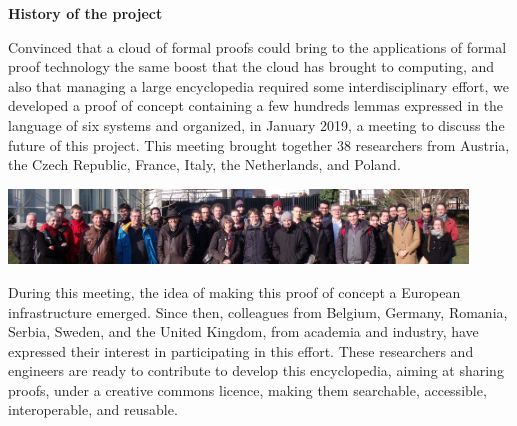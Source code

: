 \begin{shaded}
  \vspace*{-0.5cm}
  \begin{center}
    {\bf \Large History of the project}
  \end{center}

Convinced that a cloud of formal proofs could bring to the
applications of formal proof technology the same boost that the cloud
has brought to computing, and also that managing a large encyclopedia
required some interdisciplinary effort,
we developed a proof of concept containing a few hundreds lemmas
expressed in the language of six systems and organized, in January 2019,
a meeting to discuss the future of this project.
This
meeting brought together 38 researchers from Austria, the Czech
Republic, France, Italy, the Netherlands, and Poland.
\begin{center}
\includegraphics[height=2cm]{photo.png}
\end{center}
During this meeting, the idea of making this proof of concept a
European infrastructure emerged.  Since then, colleagues from Belgium,
Germany, Romania, Serbia, Sweden, and the United Kingdom, from
academia and industry, have expressed their interest in participating
in this effort.  These researchers and engineers are ready to
contribute to develop this encyclopedia, aiming at sharing proofs,
under a creative commons licence, making them searchable, accessible,
interoperable, and reusable.
\end{shaded}

